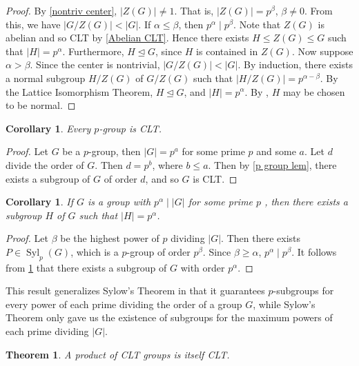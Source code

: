 \documentclass[12pt]{report}
\theoremstyle{newthm}
\newtheorem{Theorem}[lem]{Theorem}
\newtheorem{Corollary}[lem]{Corollary}
\DeclareMathOperator{\Syl}{Syl}
\begin{document}
\begin{proof}
By \cref{nontriv center}, $|Z(G)|\neq 1$. That is, $|Z(G)|=p^\beta$, $\beta\neq 0$. From this, we have $|G/Z(G)|<|G|.$ If $\alpha\leq\beta$, then $p^\alpha\mid p^\beta$.  Note that $Z(G)$ is abelian and so CLT by \cref{Abelian CLT}. Hence there exists $H\leq Z(G)\leq G$ such that $|H|=p^\alpha$. Furthermore, $H\trianglelefteq G$, since $H$ is contained in $Z(G)$. Now suppose $\alpha>\beta$. Since the center is nontrivial, $|G/Z(G)| < |G|$. By induction, there exists a normal subgroup $H/Z(G)$ of $G/Z(G)$ such that $|H/Z(G)|=p^{\alpha-\beta}$. By the Lattice Isomorphism Theorem, $H\trianglelefteq G$, and $|H|=p^\alpha$. By \cite[pg 188]{DF}, $H$ may be chosen to be normal.
\end{proof}

\begin{Corollary}\label{p groups clt} Every $p$-group is CLT.
\end{Corollary}

\begin{proof}
Let $G$ be a $p$-group, then $|G|=p^a$ for some prime $p$ and some $a$. Let $d$ divide the order of $G$. Then $d=p^b$, where $b\leq a$. Then by \cref{p group lem}, there exists a subgroup of $G$ of order $d$, and so $G$ is CLT.
\end{proof}

\begin{Corollary}\label{prime powers} If $G$ is a group with $p^\alpha\mid |G|$ for some prime $p$ , then there exists a subgroup $H$ of $G$ such that $|H|=p^\alpha$. 
\end{Corollary}

\begin{proof}
Let $\beta$ be the highest power of $p$ dividing $|G|$. Then there exists $P\in\Syl_p(G)$, which is a $p$-group of order $p^\beta$. Since $\beta \geq \alpha$, $p^\alpha\mid p^\beta$. It follows from \cref{p groups clt} that there exists a subgroup of $G$ with order $p^\alpha$.
\end{proof}

This result generalizes Sylow's Theorem in that it guarantees $p$-subgroups for every power of each prime dividing the order of a group $G$, while Sylow's Theorem only gave us the existence of subgroups for the maximum powers of each prime dividing $|G|$.

\begin{Theorem}\label{direct prod}
A product of CLT groups is itself CLT.
\end{Theorem}
\end{document}
